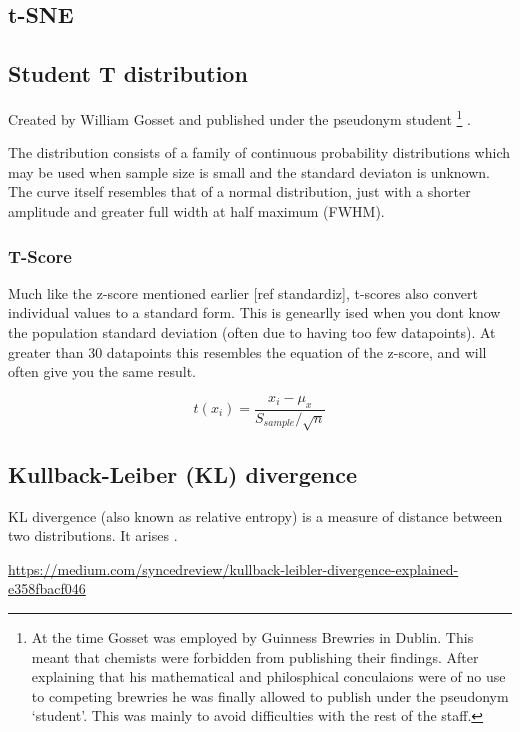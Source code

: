 \begin{appendices}
\section {t-SNE} \label{appendix:tsne}

\subsection{Student T distribution}

Created by William Gosset and published under the pseudonym student \footnote{ At the time Gosset was employed by Guinness Brewries in Dublin. This meant that chemists were forbidden from publishing their findings. After explaining that his mathematical and philosphical conculaions were of no use to competing brewries he was finally allowed to publish under the pseudonym `student'. This was mainly to avoid difficulties with the rest of the staff.} \cite{student}.

The distribution consists of a family of continuous probability distributions which may be used when sample size is small and the standard deviaton is unknown. The curve itself resembles that of a normal distribution, just with a shorter amplitude and greater full width at half maximum (FWHM).


\subsubsection{T-Score}
Much like the z-score mentioned earlier [ref standardiz], t-scores also convert individual values to a standard form. This is genearlly ised when you dont know the population standard deviation (often due to having too few datapoints). At greater than 30 datapoints this resembles the equation of the z-score, and will often give you the same result.


\begin{equation}
    t(x_i) = \frac{x_i - \mu_x}{S_{sample}/\sqrt{n} }
    \label{eqn:t}
\end{equation}

\subsection{Kullback-Leiber (KL) divergence}\label{appendix:kl}
KL divergence (also known as relative entropy) is a measure of distance between two distributions. It arises
\cite{kullback}.

\url{https://medium.com/syncedreview/kullback-leibler-divergence-explained-e358fbacf046}



\end{appendices}
